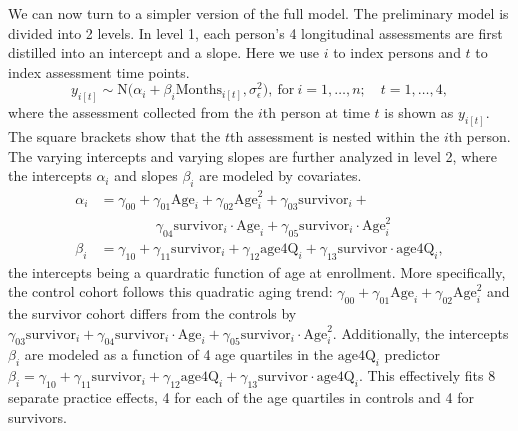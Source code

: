 \documentclass{article}
\begin{document}
We can now turn to a simpler version of the full model.  
The preliminary model is divided into
2 levels.  In level 1, each person's 4 longitudinal
assessments are first distilled into an intercept and a
slope. Here we use $i$ to index persons and $t$ to index
assessment time points.  
\begin{equation}
  y_{i[t]} \sim \mathrm{N}\bigl(\alpha_{i} + 
        \beta_{i} \mathrm{Months}_{i[t]}, \sigma^2_{\epsilon}\bigr),\ 
    \mathrm{for}\ i = 1, \dots, n;\quad  t = 1, \dots, 4,
    \label{EQ:Y}
\end{equation}
where the assessment collected from the $i$th person at
time $t$ is shown as $y_{i[t]}$.  The square brackets
show that the $t$th assessment is nested within the $i$th
person.
The varying intercepts and varying slopes are further
analyzed in level 2, where the intercepts $\alpha_i$ and slopes 
$\beta_i$ are
modeled by covariates.
\begin{equation}
\begin{aligned}
        \alpha_i &=
        \gamma_{00} +
        \gamma_{01} \mathrm{Age}_i + 
        \gamma_{02} \mathrm{Age}^2_i + 
        \gamma_{03} \mathrm{survivor}_i + \\
        & \qquad \qquad 
        \gamma_{04} \mathrm{survivor}_i\cdot \mathrm{Age}_i+ 
        \gamma_{05} \mathrm{survivor}_i\cdot \mathrm{Age}^2_i 
        \\ 
        \beta_i &= 
        \gamma_{10} + \gamma_{11} \mathrm{survivor}_i + 
        \gamma_{12} \mathrm{age4Q}_i + %
        \gamma_{13} \mathrm{survivor}\cdot
	\mathrm{age4Q}_i,
	\label{EQ:ALPHA:BETA}
\end{aligned}
\end{equation}
the intercepts being a 
quardratic function of age at enrollment.  More specifically,
the control cohort follows this quadratic aging trend:
$
\gamma_{00} + \gamma_{01} \mathrm{Age}_i + \gamma_{02}
\mathrm{Age}^2_i
$
and the survivor cohort differs from
the controls by 
$
\gamma_{03} \mathrm{survivor}_i +
        \gamma_{04} \mathrm{survivor}_i\cdot \mathrm{Age}_i+ 
        \gamma_{05} \mathrm{survivor}_i\cdot
	\mathrm{Age}^2_i.
$
Additionally, the intercepts $\beta_i$ 
are modeled as a function of 4
age quartiles in the $\mathrm{age4Q}_i$ predictor
$
        \beta_i = 
        \gamma_{10} + \gamma_{11} \mathrm{survivor}_i + 
        \gamma_{12} \mathrm{age4Q}_i + %
        \gamma_{13} \mathrm{survivor}\cdot
	\mathrm{age4Q}_i.
$
This effectively fits 8 separate practice effects, 4 for
each of the age quartiles in controls and 4 for survivors.
\end{document}

